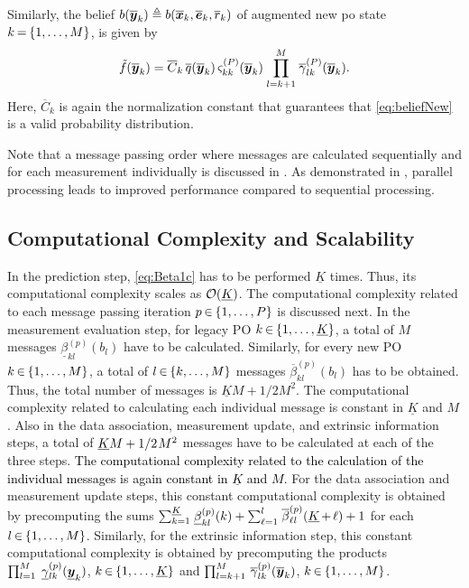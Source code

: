 \documentclass[10pt, twoside, romanappendices]{IEEEtran}
\providecommand{\rd}{\textcolor{black}}
\providecommand{\ist}{\hspace*{.3mm}}
\providecommand{\rmv}{\hspace*{-.3mm}}
\begin{document}
Similarly, the belief $b(\overline{\bm{y}}_{k}) \triangleq b(\overline{\bm{x}}_{k},\overline{\bm{e}}_{k},\overline{r}_{k})$ of augmented new \ac{po} state $k \rmv=\rmv \{1,\dots,M\}$, is given \vspace{-1.2mm} by
\begin{equation}
\tilde{f}(\overline{\V{y}}_{k}) = \overline{C}_k \ist\ist \overline{q}(\overline{\V{y}}_{k}) \ist\ist \varsigma_{kk}^{(P)}(\overline{\V{y}}_{k}) \ist \prod^{M}_{l=k+1} \ist \overline{\gamma}^{(P)}_{lk}(\overline{\V{y}}_{k}).
\label{eq:beliefNew}
\end{equation}
Here, $\overline{C}_k$ is again the normalization constant that guarantees that \eqref{eq:beliefNew} is a valid probability distribution.

Note that a message passing order where messages are calculated sequentially and for each measurement individually is discussed in \cite{MeyWil:C20}. As demonstrated in \cite[Section V]{MeyWil:C20}, parallel processing leads to improved performance compared to sequential processing. 

\subsection{Computational Complexity and Scalability}
In the prediction step, \eqref{eq:Beta1c} has to be performed $\underline{K}$ times. Thus, its computational complexity scales as $\Set{O}(\underline{K})$. The computational complexity related to each message passing iteration $p \rmv\in\rmv \{1,\dots,P\}$ is discussed next. In the measurement evaluation step, for legacy PO $k \rmv\in\rmv \{1,\dots,\underline{K}\}$, a total of $M$ messages $\underline{\beta}_{kl}^{(p)}(b_{l})$ have to be calculated. Similarly, for every new PO $k \rmv\in\rmv \{1,\dots,M\}$, a total of $l \rmv\in\rmv \{k,\dots,M\}$ messages $\overline{\beta}_{kl}^{(p)}(b_{l})$ has to be obtained. Thus, the total number of messages is $\underline{K} M + 1/2 M^2$. The computational complexity related to calculating each individual message is constant in $\underline{K}$ and $M$. Also in the data association, measurement update, and extrinsic information steps, a total of $\underline{K} M + 1/2 \ist M^2$ messages have to be calculated at each of the three steps. \rd{The computational complexity related to the calculation of the individual messages is again constant in $\underline{K}$ and $M$.} For the data association and measurement update steps, this constant computational complexity is obtained by precomputing the sums  $\sum^{\underline{K}}_{k=1} \ist \underline{\beta}_{kl}^{(p)}(k) + \sum^{l}_{\substack{\ell=1}} \ist \overline{\beta}_{\ell l}^{(p)}(\underline{K} \rmv+\rmv \ell) + 1$ for each $l \rmv\in\rmv \{1,\dots,M\}$. Similarly, for the extrinsic information step, this constant computational complexity is obtained by precomputing the products $\prod^{M}_{l=1} \ist\ist\ist \underline{\gamma}^{(p)}_{lk}(\underline{\V{y}}_{k})$, $k \rmv\in\rmv \{1,\dots,\underline{K}\}$ and $\prod^{M}_{l=k+1} \ist\ist \overline{\gamma}^{(p)}_{lk}(\overline{\V{y}}_{k})$, $k \rmv\in\rmv \{1,\dots,M\}$. 
\end{document}
